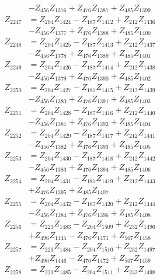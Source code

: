 \begin{multicols}{2}
\begin{align}
&- Z_{456}Z_{1376} + Z_{476}Z_{1387} + Z_{485}Z_{1399} \nonumber \\
Z_{2247} &= Z_{204}Z_{1424} - Z_{187}Z_{1412} + Z_{212}Z_{1436}  \nonumber \\
&- Z_{456}Z_{1377} + Z_{476}Z_{1388} + Z_{485}Z_{1400} \nonumber \\
Z_{2248} &= Z_{204}Z_{1425} - Z_{187}Z_{1413} + Z_{212}Z_{1437}  \nonumber \\
&- Z_{456}Z_{1378} + Z_{476}Z_{1389} + Z_{485}Z_{1401} \nonumber \\
Z_{2249} &= Z_{204}Z_{1426} - Z_{187}Z_{1414} + Z_{212}Z_{1438}  \nonumber \\
&- Z_{456}Z_{1379} + Z_{476}Z_{1390} + Z_{485}Z_{1402} \nonumber \\
Z_{2250} &= Z_{204}Z_{1427} - Z_{187}Z_{1415} + Z_{212}Z_{1439}  \nonumber \\
&- Z_{456}Z_{1380} + Z_{476}Z_{1391} + Z_{485}Z_{1403} \nonumber \\
Z_{2251} &= Z_{204}Z_{1428} - Z_{187}Z_{1416} + Z_{212}Z_{1440}  \nonumber \\
&- Z_{456}Z_{1381} + Z_{476}Z_{1392} + Z_{485}Z_{1404} \nonumber \\
Z_{2252} &= Z_{204}Z_{1429} - Z_{187}Z_{1417} + Z_{212}Z_{1441}  \nonumber \\
&- Z_{456}Z_{1382} + Z_{476}Z_{1393} + Z_{485}Z_{1405} \nonumber \\
Z_{2253} &= Z_{204}Z_{1430} - Z_{187}Z_{1418} + Z_{212}Z_{1442}  \nonumber \\
&- Z_{456}Z_{1383} + Z_{476}Z_{1394} + Z_{485}Z_{1406} \nonumber \\
Z_{2254} &= Z_{204}Z_{1431} - Z_{187}Z_{1419} + Z_{212}Z_{1443}  \nonumber \\
&+ Z_{476}Z_{1395} + Z_{485}Z_{1407} \nonumber \\
Z_{2255} &= Z_{204}Z_{1432} - Z_{187}Z_{1420} + Z_{212}Z_{1444}  \nonumber \\
&- Z_{456}Z_{1384} + Z_{476}Z_{1396} + Z_{485}Z_{1408} \nonumber \\
Z_{2256} &= Z_{223}Z_{1483} - Z_{204}Z_{1509} + Z_{232}Z_{1496}  \nonumber \\
&+ Z_{496}Z_{1445} - Z_{476}Z_{1471} + Z_{507}Z_{1458} \nonumber \\
Z_{2257} &= Z_{223}Z_{1484} - Z_{204}Z_{1510} + Z_{232}Z_{1497}  \nonumber \\
&+ Z_{496}Z_{1446} - Z_{476}Z_{1472} + Z_{507}Z_{1459} \nonumber \\
Z_{2258} &= Z_{223}Z_{1485} - Z_{204}Z_{1511} + Z_{232}Z_{1498}  \nonumber \\

\end{align}
\end{multicols}
